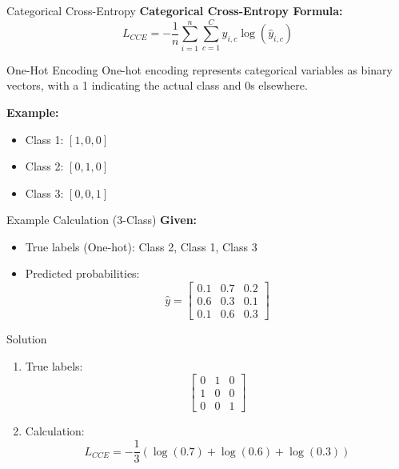 \documentclass[serif, aspectratio=169]{beamer}
\begin{document}

\begin{frame}{Categorical Cross-Entropy}
    \textbf{Categorical Cross-Entropy Formula:}
    \[
    L_{CCE} = - \frac{1}{n} \sum_{i=1}^{n} \sum_{c=1}^{C} y_{i,c} \log(\hat{y}_{i,c})
    \]
\end{frame}

\begin{frame}{One-Hot Encoding}
    One-hot encoding represents categorical variables as binary vectors, with a 1 indicating the actual class and 0s elsewhere.
    
    \textbf{Example:} \\
    \begin{itemize}
        \item Class 1: \([1, 0, 0]\)
        \item Class 2: \([0, 1, 0]\)
        \item Class 3: \([0, 0, 1]\)
    \end{itemize}
\end{frame}

\begin{frame}{Example Calculation (3-Class)}
    \textbf{Given:}
    \begin{itemize}
        \item True labels (One-hot): Class 2, Class 1, Class 3
        \item Predicted probabilities:
        \[
        \hat{y} = \begin{bmatrix} 
        0.1 & 0.7 & 0.2 \\ 
        0.6 & 0.3 & 0.1 \\ 
        0.1 & 0.6 & 0.3 
        \end{bmatrix}
        \]
    \end{itemize}
\end{frame}

\begin{frame}{Solution}
    \begin{enumerate}
        \item True labels:
        \[
        \begin{bmatrix} 
        0 & 1 & 0 \\ 
        1 & 0 & 0 \\ 
        0 & 0 & 1 
        \end{bmatrix}
        \]
        \item Calculation:
        \[
        L_{CCE} = -\frac{1}{3} \left( \log(0.7) + \log(0.6) + \log(0.3) \right)
        \]
    \end{enumerate}
\end{frame}
\end{document}
